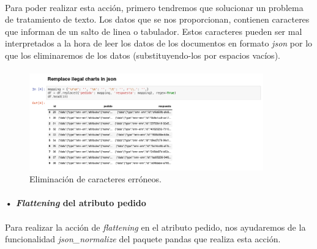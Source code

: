\documentclass[10pt,a4paper,oneside]{book}
\begin{document}
\paragraph{}
Para poder realizar esta acción, primero tendremos que solucionar un problema de tratamiento de texto. Los datos que se nos proporcionan, contienen caracteres que informan de un salto de linea o tabulador. Estos caracteres pueden ser mal interpretados a la hora de leer los datos de los documentos en formato \textit{json} por lo que los eliminaremos de los datos (substituyendo-los por espacios vacíos).

\paragraph{}
\begin{figure}[!htb]
  \centering
  \includegraphics[width=0.9\textwidth]{images/metodologia-eliminar-caracteres-prohibidos.png}
  \caption{Eliminación de caracteres erróneos.}
\end{figure}

\newpage
\paragraph{• \textit{Flattening} del atributo pedido}

\paragraph{}
Para realizar la acción de \textit{flattening} en el atributo pedido, nos ayudaremos de la funcionalidad \textit{json\_normalize} del paquete pandas que realiza esta acción. 
\end{document}
